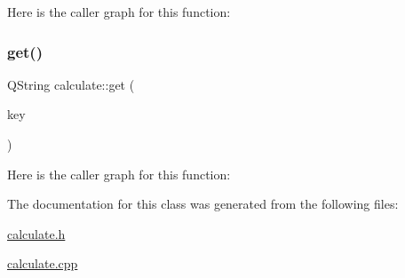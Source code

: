 Here is the caller graph for this function\+:
\mbox{\label{classcalculate_af19e3a32ffe1de21111b6bb167c1d905}} 
\subsubsection{\texorpdfstring{get()}{get()}}
{\footnotesize\ttfamily Q\+String calculate\+::get (\begin{DoxyParamCaption}\item[{Q\+String}]{key }\end{DoxyParamCaption})}

Here is the caller graph for this function\+:


The documentation for this class was generated from the following files\+:\begin{DoxyCompactItemize}
\item 
\hyperlink{calculate_8h}{calculate.\+h}\item 
\hyperlink{calculate_8cpp}{calculate.\+cpp}\end{DoxyCompactItemize}
